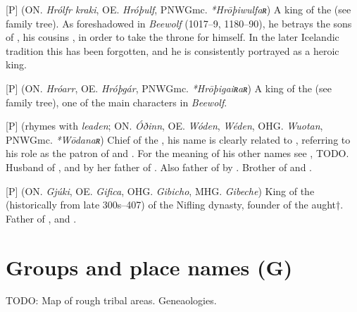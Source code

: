 \begin{itemize}
[P] (ON. \emph{Hrólfr kraki}, OE. \emph{Hróþulf}, PNWGmc. \emph{*Hrōþiwulfaʀ})
  A king of the  (see family tree). As foreshadowed in \emph{Beewolf} (1017–9, 1180–90), he betrays the sons of , his cousins , in order to take the throne for himself. In the later Icelandic tradition this has been forgotten, and he is consistently portrayed as a heroic king.

[P] (ON. \emph{Hróarr}, OE. \emph{Hróþgár}, PNWGmc. \emph{*Hrōþigaiʀaʀ})
  A king of the  (see family tree), one of the main characters in \emph{Beewolf}.

[P] (rhymes with \emph{leaden}; ON. \emph{Óðinn}, OE. \emph{Wóden}, \emph{Wéden}, OHG. \emph{Wuotan}, PNWGmc. \emph{*Wōdanaʀ})
  Chief of the , his name is clearly related to , referring to his role as the patron of  and . For the meaning of his other names see ,  TODO. Husband of , and by her father of . Also father of  by . Brother of  and .

[P] (ON. \emph{Gjúki}, OE. \emph{Gifica}, OHG. \emph{Gibicho}, MHG. \emph{Gibeche})
  King of the  (historically from late 300s–407) of the Nifling dynasty, founder of the  aught†. Father of ,  and .

\end{itemize}


\section{Groups and place names (G)}

TODO: Map of rough tribal areas. Geneaologies.

